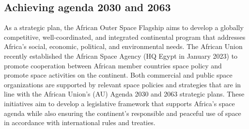 \documentclass[final,5p,times, twocolumn, sort&compress, sc]{elsarticle}
\begin{document}
\subsection{\textbf{Achieving agenda 2030 and 2063}}
As a strategic plan, the African Outer Space Flagship aims to develop a globally competitive, well-coordinated, and integrated continental program that addresses Africa's social, economic, political, and environmental needs. The African Union recently established the African Space Agency (HQ Egypt in January 2023) to promote cooperation between African member countries space policy and promote space activities on the continent. Both commercial and public space organizations are supported by relevant space policies and strategies that are in line with the African Union's (AU) Agenda 2030 and 2063 strategic plans. These initiatives aim to develop a legislative framework that supports Africa's space agenda while also ensuring the continent's responsible and peaceful use of space in accordance with international rules and treaties.
\end{document}

